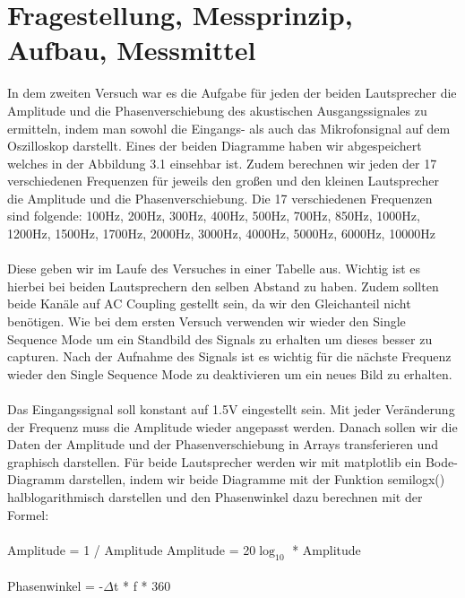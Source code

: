 \documentclass[12pt, oneside, a4paper, \docLanguage]{report}
\begin{document}
\section{Fragestellung, Messprinzip, Aufbau, Messmittel}
\label{chap:VERSUCH_2_FRAGESTELLUNG}
In dem zweiten Versuch war es die Aufgabe für jeden der beiden Lautsprecher die Amplitude und die Phasenverschiebung des akustischen Ausgangssignales zu ermitteln, indem man sowohl die Eingangs- als auch das Mikrofonsignal auf dem Oszilloskop darstellt.
\newline 
Eines der beiden Diagramme haben wir abgespeichert welches in der Abbildung 3.1 einsehbar ist.
Zudem berechnen wir jeden der 17 verschiedenen Frequenzen für jeweils den großen und den kleinen Lautsprecher die Amplitude und die Phasenverschiebung.
Die 17 verschiedenen Frequenzen sind folgende:
\newline
100Hz, 200Hz, 300Hz, 400Hz, 500Hz, 700Hz, 850Hz, 1000Hz, 1200Hz, 1500Hz, 1700Hz, 2000Hz, 3000Hz, 4000Hz, 5000Hz, 6000Hz, 10000Hz
\\~\\
Diese geben wir im Laufe des Versuches in einer Tabelle aus.
Wichtig ist es hierbei bei beiden Lautsprechern den selben Abstand zu haben. Zudem sollten beide Kanäle auf AC Coupling gestellt sein, da wir den Gleichanteil nicht benötigen.
\newline
Wie bei dem ersten Versuch verwenden wir wieder den Single Sequence Mode um ein Standbild des Signals zu erhalten um dieses besser zu capturen.
\newline
Nach der Aufnahme des Signals ist es wichtig für die nächste Frequenz wieder den Single Sequence Mode zu deaktivieren um ein neues Bild zu erhalten.
\\~\\
Das Eingangssignal soll konstant auf 1.5V eingestellt sein. Mit jeder Veränderung der Frequenz muss die Amplitude wieder angepasst werden.
Danach sollen wir die Daten der Amplitude und der Phasenverschiebung in Arrays transferieren und graphisch darstellen.
\newpage
Für beide Lautsprecher werden wir mit matplotlib ein Bode-Diagramm darstellen, indem wir beide Diagramme mit der Funktion semilogx() halblogarithmisch darstellen und den Phasenwinkel dazu berechnen mit der Formel:
\\~\\
Amplitude = 1 / Amplitude
\newline
Amplitude = 20$\log _{10}$ * Amplitude
\\~\\
Phasenwinkel = -$\Delta$t * f * 360
\end{document}
